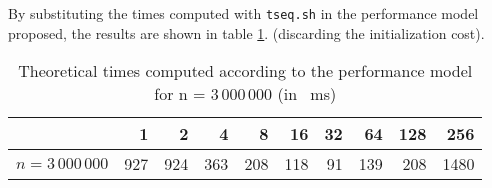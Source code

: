 \documentclass[]{article}
\def\code#1{\texttt{#1}}
\begin{document}
By substituting the times computed with \code{tseq.sh} in the performance model proposed, the results are shown in table \ref{tab:perfModel}. (discarding the initialization cost).
\begin{table}[H]
	\centering
	\begin{tabular}{l|*{9}r}
		\toprule
			\diagbox{time}{$\mathit{nw}$} 
		& 1 & 2 & 4 & 8 & 16 & 32 & 64 & 128 & 256 \\
		\midrule
		$n=3\,000\,000$ & 927 & 924 & 363 & 208 & 118 & 91 & 139 & 208 & 1480 \\
		\bottomrule
	\end{tabular}%
	\caption{Theoretical times computed according to the performance model for n = $3\,000\,000$ (in \SI{}{\milli \second})}
	\label{tab:perfModel}%
\end{table}%
\end{document}
